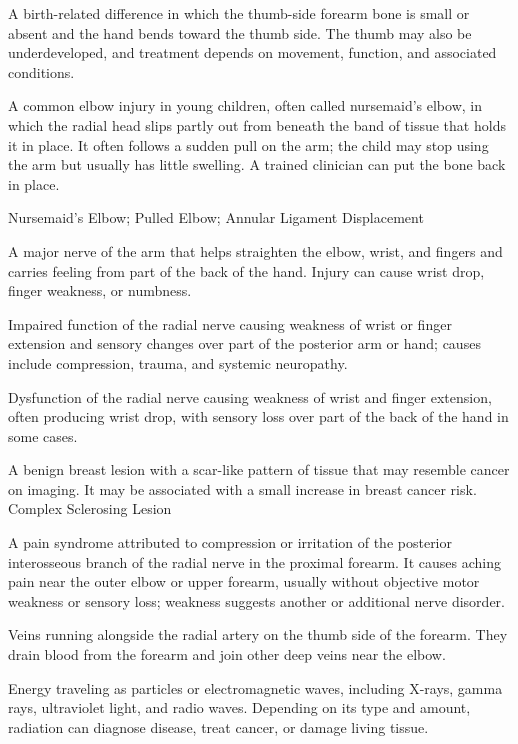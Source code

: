  A birth-related difference in which the thumb-side forearm bone is small or absent and the hand bends toward the thumb side. The thumb may also be underdeveloped, and treatment depends on movement, function, and associated conditions.

 A common elbow injury in young children, often called nursemaid’s elbow, in which the radial head slips partly out from beneath the band of tissue that holds it in place. It often follows a sudden pull on the arm; the child may stop using the arm but usually has little swelling. A trained clinician can put the bone back in place.

\synonyms
Nursemaid's Elbow; Pulled Elbow; Annular Ligament Displacement

 A major nerve of the arm that helps straighten the elbow, wrist, and fingers and carries feeling from part of the back of the hand. Injury can cause wrist drop, finger weakness, or numbness.

 Impaired function of the radial nerve causing weakness of wrist or finger extension and sensory changes over part of the posterior arm or hand; causes include compression, trauma, and systemic neuropathy.

 Dysfunction of the radial nerve causing weakness of wrist and finger extension, often producing wrist drop, with sensory loss over part of the back of the hand in some cases.

 A benign breast lesion with a scar-like pattern of tissue that may resemble cancer on imaging. It may be associated with a small increase in breast cancer risk.
\synonyms
Complex Sclerosing Lesion

 A pain syndrome attributed to compression or irritation of the posterior interosseous branch of the radial nerve in the proximal forearm. It causes aching pain near the outer elbow or upper forearm, usually without objective motor weakness or sensory loss; weakness suggests another or additional nerve disorder.

 Veins running alongside the radial artery on the thumb side of the forearm. They drain blood from the forearm and join other deep veins near the elbow.

 Energy traveling as particles or electromagnetic waves, including X-rays, gamma rays, ultraviolet light, and radio waves. Depending on its type and amount, radiation can diagnose disease, treat cancer, or damage living tissue.

